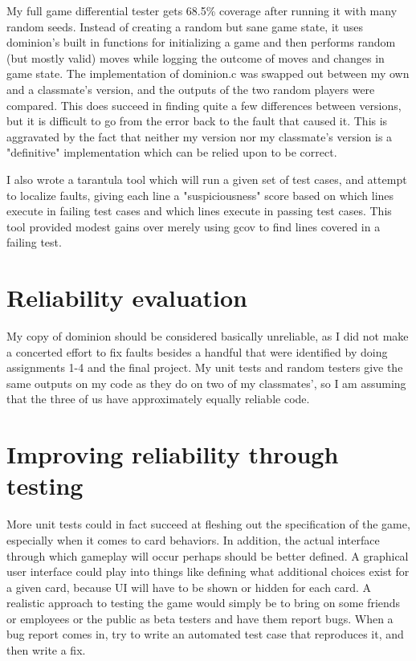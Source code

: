 \documentclass[11pt]{article}
\begin{document}
My full game differential tester gets 68.5\% coverage after running it with many random seeds. Instead of creating a random but sane game state, it uses dominion's built in functions for initializing a game and then performs random (but mostly valid) moves while logging the outcome of moves and changes in game state. The implementation of dominion.c was swapped out between my own and a classmate's version, and the outputs of the two random players were compared. This does succeed in finding quite a few differences between versions, but it is difficult to go from the error back to the fault that caused it. This is aggravated by the fact that neither my version nor my classmate's version is a "definitive" implementation which can be relied upon to be correct.

I also wrote a tarantula tool which will run a given set of test cases, and attempt to localize faults, giving each line a "suspiciousness" score based on which lines execute in failing test cases and which lines execute in passing test cases. This tool provided modest gains over merely using gcov to find lines covered in a failing test.

\section{Reliability evaluation}
My copy of dominion should be considered basically unreliable, as I did not make a concerted effort to fix faults besides a handful that were identified by doing assignments 1-4 and the final project. My unit tests and random testers give the same outputs on my code as they do on two of my classmates', so I am assuming that the three of us have approximately equally reliable code.

\section{Improving reliability through testing}
More unit tests could in fact succeed at fleshing out the specification of the game, especially when it comes to card behaviors. In addition, the actual interface through which gameplay will occur perhaps should be better defined. A graphical user interface could play into things like defining what additional choices exist for a given card, because UI will have to be shown or hidden for each card. A realistic approach to testing the game would simply be to bring on some friends or employees or the public as beta testers and have them report bugs. When a bug report comes in, try to write an automated test case that reproduces it, and then write a fix.
\end{document}
